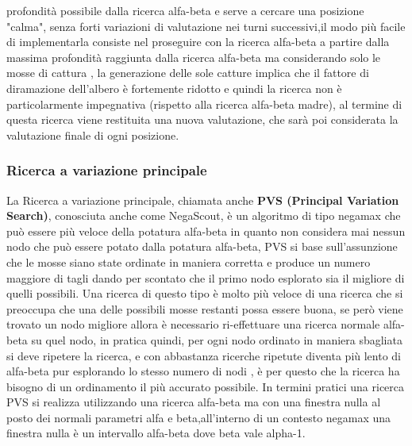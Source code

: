 profondità possibile dalla ricerca alfa-beta e serve a cercare una posizione "calma", senza forti variazioni di valutazione nei turni successivi,il modo più facile di implementarla consiste nel proseguire con la ricerca
alfa-beta a partire dalla massima profondità raggiunta dalla ricerca alfa-beta ma considerando solo le mosse di cattura , la generazione delle sole catture implica che il fattore di diramazione dell'albero è fortemente ridotto e quindi la 
ricerca non è particolarmente impegnativa (rispetto alla ricerca alfa-beta madre), al termine di questa ricerca viene restituita una nuova valutazione, che sarà poi considerata la valutazione finale di ogni posizione.


 


\subsubsection{Ricerca a variazione principale}
La Ricerca a variazione principale, chiamata anche \textbf{PVS (Principal Variation Search)}, conosciuta anche come NegaScout, è un algoritmo di tipo negamax che può essere più veloce della potatura alfa-beta 
in quanto non considera  mai nessun nodo che può essere potato dalla potatura alfa-beta, PVS si base sull'assunzione che le mosse siano state ordinate in maniera corretta e produce un numero maggiore di tagli
dando per scontato che il primo nodo esplorato sia il migliore di quelli possibili. Una ricerca di questo tipo è molto più veloce di una ricerca che si preoccupa che una delle possibili mosse restanti possa essere 
buona, se però viene trovato un nodo migliore allora è necessario ri-effettuare una ricerca normale alfa-beta su quel nodo, in pratica quindi, per ogni nodo ordinato in maniera sbagliata si deve ripetere la ricerca, e 
con abbastanza ricerche ripetute diventa più lento di alfa-beta pur esplorando lo stesso numero di nodi , è per questo che la ricerca ha bisogno di un ordinamento il più accurato possibile.
In termini pratici una ricerca PVS si realizza utilizzando una ricerca alfa-beta ma con una finestra nulla al posto dei normali parametri alfa e beta,all'interno di un contesto negamax una finestra nulla è un 
intervallo alfa-beta dove beta vale alpha-1.



